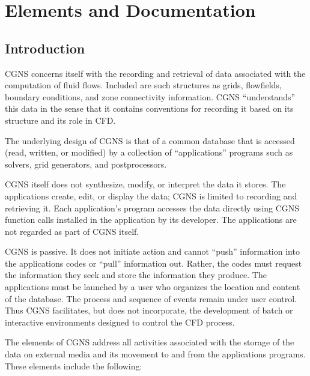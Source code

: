 \section{Elements and Documentation}
\label{s:elements}
\thispagestyle{plain}

\subsection{Introduction}

CGNS concerns itself with the recording and retrieval of data associated
with the computation of fluid flows.
Included are such structures as grids, flowfields, boundary conditions,
and zone connectivity information.
CGNS ``understands'' this data in the sense that it contains conventions
for recording it based on its structure and its role in CFD.

The underlying design of CGNS is that of a common database that is
accessed (read, written, or modified) by a collection of ``applications''
programs such as solvers, grid generators, and postprocessors.

CGNS itself does not synthesize, modify, or interpret the data it
stores.
The applications create, edit, or display the data; CGNS is limited to
recording and retrieving it.
Each application's program accesses the data directly using CGNS
function calls installed in the application by its developer.
The applications are not regarded as part of CGNS itself.

CGNS is passive.
It does not initiate action and cannot ``push'' information into the
applications codes or ``pull'' information out.
Rather, the codes must request the information they seek and store the
information they produce.
The applications must be launched by a user who organizes the location
and content of the database.
The process and sequence of events remain under user control.
Thus CGNS facilitates, but does not incorporate, the development of
batch or interactive environments designed to control the CFD process.

The elements of CGNS address all activities associated with the
storage of the data on external media and its movement to and from the
applications programs.
These elements include the following:

